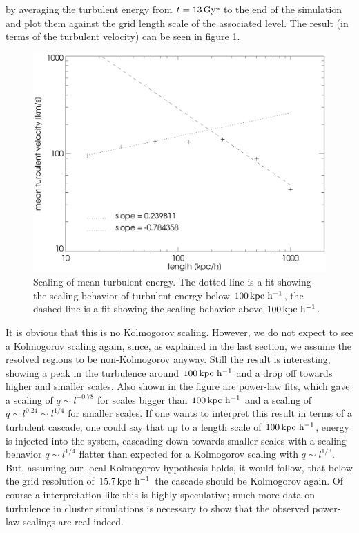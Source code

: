 by averaging the turbulent energy from $t=\unit[13]{Gyr}$ to the end of the
simulation and plot them against the grid length scale of the associated level.
The result (in terms of the turbulent velocity) can be seen in figure 
\ref{fig:tuefitcluster}. 
\begin{figure}[tp]
\centering
\includegraphics[width=0.7\linewidth]{chapter9/tuemwfitcluster128.eps}
\caption{Scaling of mean turbulent energy. The dotted line is a fit showing the
scaling behavior of turbulent energy below $\unit[100]{kpc\ h^{-1}}$, the dashed
line is a fit showing the scaling behavior above $\unit[100]{kpc\ h^{-1}}$.}
\label{fig:tuefitcluster}
\end{figure}
It is obvious that this is no Kolmogorov scaling. However, we do not expect to
see a Kolmogorov scaling again, since, as explained in the last section, we
assume the resolved regions to be non-Kolmogorov anyway. Still the result is
interesting, showing a peak in the turbulence around $\unit[100]{kpc\ h^{-1}}$
and a drop off towards higher and smaller scales. Also shown in the figure are
power-law fits, which gave a scaling of $q \sim l^{-0.78}$ for scales bigger
than $\unit[100]{kpc\ h^{-1}}$ and a scaling of $q \sim l^{0.24} \sim l^{1/4}$
for smaller scales. If one wants to interpret this result in terms of a
turbulent cascade, one could say that up to a length scale of  
$\unit[100]{kpc\ h^{-1}}$, energy is injected into the system, cascading down
towards smaller scales with a scaling behavior $q \sim l^{1/4}$ flatter than
expected for a Kolmogorov scaling with $q \sim l^{1/3}$. But, assuming our local
Kolmogorov hypothesis holds, it would follow, that below the grid resolution
of $\unit[15.7]{kpc\ h^{-1}}$ the cascade should be Kolmogorov again. Of course
a interpretation like this is highly speculative; much more data on
turbulence in cluster simulations is necessary to show that the
observed power-law scalings are real indeed.

